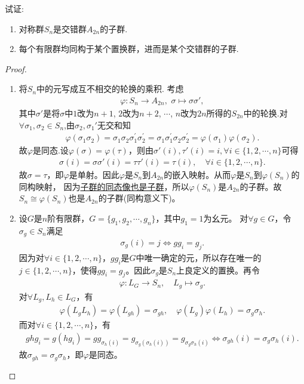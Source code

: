 \documentclass[../../main.tex]{subfiles}%
\begin{document}
\begin{proposition}
试证:
\begin{enumerate}[(1)]
\item 对称群$S_n$是交错群$A_{2n}$的子群.
\item 每个有限群均同构于某个置换群，进而是某个交错群的子群.
\end{enumerate}
\end{proposition}
\begin{proof}
\begin{enumerate}[(1)]
\item 将$S_n$中的元写成互不相交的轮换的乘积. 考虑
\begin{align*}
\varphi:S_n \to A_{2n},\,\, \sigma \mapsto \sigma\sigma',
\end{align*}
其中$\sigma'$是将$\sigma$中$1$改为$n+1$, $2$改为$n+2$, $\cdots$, $n$改为$2n$所得的$S_{2n}$中的轮换.对$\forall \sigma_1,\sigma_2\in S_n$,由$\sigma_2,\sigma_1'$无交和知
\begin{align*}
\varphi \left( \sigma _1\sigma _2 \right) =\sigma _1\sigma _2\sigma _{1}^{\prime}\sigma _{2}^{\prime}=\sigma _1\sigma _{1}^{\prime}\sigma _2\sigma _{2}^{\prime}=\varphi \left( \sigma _1 \right) \varphi \left( \sigma _2 \right) . 
\end{align*}
故$\varphi$是同态.设$\varphi(\sigma)=\varphi(\tau)$，则由$\sigma'(i),\tau'(i)=i,\forall i\in\{1,2,\cdots,n\}$可得\begin{align*}
\sigma(i)=\sigma\sigma'(i)=\tau\tau'(i)=\tau(i),\quad \forall i\in\{1,2,\cdots,n\}.
\end{align*}
故$\sigma=\tau$，即$\varphi$是单射。因此$\varphi$是$S_n$到$A_{2n}$的嵌入映射。从而$\varphi$是$S_n$到$\varphi(S_n)$的同构映射，
因为\hyperref[theorem:群同态与同构的基本性质-3]{子群的同态像也是子群}，所以$\varphi(S_n)$是$A_{2n}$的子群。故$S_n\cong\varphi(S_n)$也是$A_{2n}$的子群(同构意义下)。

\item 设$G$是$n$阶有限群，$G=\{g_1,g_2,\cdots,g_n\}$，其中$g_1=1$为幺元。
对$\forall g\in G$，令$\sigma_g\in S_n$满足\begin{align*}
\sigma_g(i)=j\Longleftrightarrow gg_i=g_j.
\end{align*}
因为对$\forall i\in\{1,2,\cdots,n\}$，$gg_i$是$G$中唯一确定的元，所以存在唯一的$j\in\{1,2,\cdots,n\}$，使得$gg_i=g_j$。因此$\sigma_g$是$S_n$上良定义的置换。再令\begin{align*}
\varphi:L_G\rightarrow S_n,\quad L_g\mapsto \sigma_g.
\end{align*}
对$\forall L_g,L_h\in L_G$，有\begin{align*}
\varphi(L_gL_h)=\varphi(L_{gh})=\sigma_{gh},\quad \varphi(L_g)\varphi(L_h)=\sigma_g\sigma_h.
\end{align*}
而对$\forall i\in\{1,2,\cdots,n\}$，有\begin{align*}
ghg_i=g(hg_i)=gg_{\sigma_h(i)}=g_{\sigma_g(\sigma_h(i))}=g_{\sigma_g\sigma_h(i)}\Longleftrightarrow \sigma_{gh}(i)=\sigma_g\sigma_h(i).
\end{align*}
故$\sigma_{gh}=\sigma_g\sigma_h$，即$\varphi$是同态。


\end{enumerate}
\end{proof}
\end{document}
